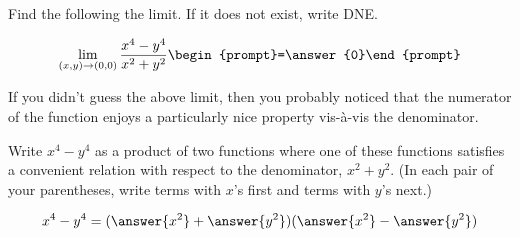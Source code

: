 \documentclass{ximera}
\author{David Guichard \and Neal Koblitz \and H. Jerome Keisler \and Albert Scheller \and Barry Balof \and Mike Wills \and Matthew Carr}
\begin{document}
\begin{exercise}




Find the following the limit. If it does not exist, write DNE. 

\[
\lim_{(x,y)\to(0,0)}\frac{x^4-y^4}{x^2+y^2}\begin{prompt}=\answer{0}\end{prompt}
\]

If you didn't guess the above limit, then you probably noticed that the numerator of the function enjoys a particularly nice property vis-\`a-vis the denominator. 

Write $x^4-y^4$ as a product of two functions where one of these functions satisfies a convenient relation with respect to the denominator, $x^2+y^2$. (In each pair of your parentheses, write terms with $x$'s first and terms with $y$'s next.)

\begin{prompt}
\[
x^4-y^4=(\answer{x^2}+\answer{y^2})(\answer{x^2}-\answer{y^2})
\]
\end{prompt}

\end{exercise}
\end{document}
